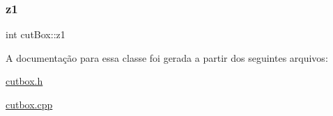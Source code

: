 \mbox{\label{classcut_box_a845ab6906ad3f7b3aeb14d4228aabe62}} 
\subsubsection{\texorpdfstring{z1}{z1}}
{\footnotesize\ttfamily int cut\+Box\+::z1\hspace{0.3cm}{\ttfamily [protected]}}



A documentação para essa classe foi gerada a partir dos seguintes arquivos\+:\begin{DoxyCompactItemize}
\item 
\mbox{\hyperlink{cutbox_8h}{cutbox.\+h}}\item 
\mbox{\hyperlink{cutbox_8cpp}{cutbox.\+cpp}}\end{DoxyCompactItemize}
